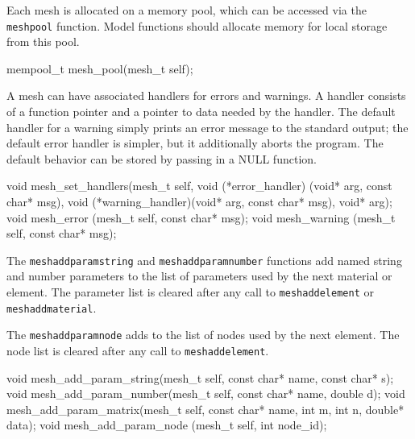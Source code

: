 Each mesh is allocated on a memory pool, which can be accessed via
the {\tt{}mesh{}pool} function.  Model functions should allocate memory
for local storage from this pool.

\nwenddocs{}\plusendmoddef
mempool_t mesh_pool(mesh_t self);

\nwendcode{}\nwdocspar

A mesh can have associated handlers for errors and warnings.
A handler consists of a function pointer and a pointer
to data needed by the handler.  The default handler for a
warning simply prints an error message to the standard output;
the default error handler is simpler, but it additionally
aborts the program.  The default behavior can be stored by
passing in a NULL function.

\nwenddocs{}\plusendmoddef
void mesh_set_handlers(mesh_t self,
                       void (*error_handler)  (void* arg, const char* msg),
                       void (*warning_handler)(void* arg, const char* msg),
                       void* arg);
void mesh_error       (mesh_t self, const char* msg);
void mesh_warning     (mesh_t self, const char* msg);


\nwendcode{}\nwdocspar

The {\tt{}mesh{}add{}param{}string} and {\tt{}mesh{}add{}param{}number} functions
add named string and number parameters to the list of parameters
used by the next material or element.  The parameter list is
cleared after any call to {\tt{}mesh{}add{}element} or {\tt{}mesh{}add{}material}.

The {\tt{}mesh{}add{}param{}node} adds to the list of nodes used by the next
element.  The node list is cleared after any call to {\tt{}mesh{}add{}element}.

\nwenddocs{}\plusendmoddef
void mesh_add_param_string(mesh_t self, const char* name, const char* s);
void mesh_add_param_number(mesh_t self, const char* name, double d);
void mesh_add_param_matrix(mesh_t self, const char* name, int m, int n,
                           double* data);
void mesh_add_param_node  (mesh_t self, int node_id);

